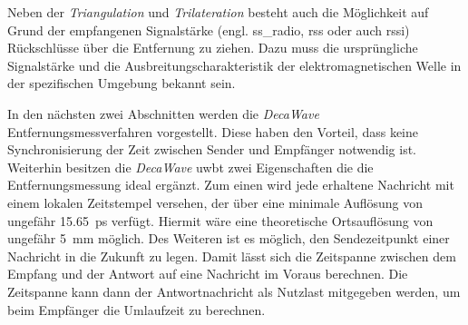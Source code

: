 Neben der \textit{Triangulation} und \textit{Trilateration} besteht auch die Möglichkeit auf Grund der empfangenen Signalstärke (engl. \acrfull{ss_radio}, \acrfull{rss} oder auch \acrfull{rssi}) Rückschlüsse über die Entfernung zu ziehen. Dazu muss die ursprüngliche Signalstärke und die Ausbreitungscharakteristik der elektromagnetischen Welle in der spezifischen Umgebung bekannt sein. \cite{gezici2005localization, decawave2014rtls}

In den nächsten zwei Abschnitten werden die \textit{DecaWave} Entfernungsmessverfahren vorgestellt. Diese haben den Vorteil, dass keine Synchronisierung der Zeit zwischen Sender und Empfänger notwendig ist. Weiterhin besitzen die \textit{DecaWave} \Gls{uwbt} zwei Eigenschaften die die Entfernungsmessung ideal ergänzt. Zum einen wird jede erhaltene Nachricht mit einem lokalen Zeitstempel versehen, der über eine minimale Auflösung von ungefähr \SI{15.65}{\pico\second} verfügt. Hiermit wäre eine theoretische Ortsauflösung von ungefähr \SI{5}{\milli\metre} möglich. Des Weiteren ist es möglich, den Sendezeitpunkt einer Nachricht in die Zukunft zu legen. Damit lässt sich die Zeitspanne zwischen dem Empfang und der Antwort auf eine Nachricht im Voraus berechnen. Die Zeitspanne kann dann der Antwortnachricht als Nutzlast mitgegeben werden, um beim Empfänger die Umlaufzeit zu berechnen.


\begin{comment}
------------------------------------------------------------------------------------------
- Wie lange dauert es bis eine Nachricht ausgetauscht worden ist?
	- Beispiel mit einer konkreten Entfernung?
	
- Wie schnell drifted ein Quarz in einem µc?
	- What is the ppm in the crystal oscillator?
	- https://electronics.stackexchange.com/questions/15851/what-is-the-ppm-in-the-crystal-oscillator
	- In the 1930s, such precise time measurements simply weren't possible; a clock of the required accuracy was difficult enough to build in fixed form, let alone portable. A crystal oscillator, for instance, drifts about 1 to 2 seconds in a month, or 1.4x10−3 seconds an hour.[1] This may sound small, but as light travels 3x108 m/s, this represents a drift of 400 m per hour. Only a few hours of flight time would render such a system unusable, a situation that remained in force until the introduction of commercial atomic clocks in the 1960s.
	- Clock accuracy in ppm
	- http://www.best-microcontroller-projects.com/ppm.html
	

\end{comment}
